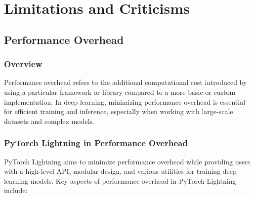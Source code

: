 \documentclass[12pt]{article}
\begin{document}
\section{Limitations and Criticisms}

\subsection{Performance Overhead}

\subsubsection{Overview}

Performance overhead refers to the additional computational cost introduced by using a particular framework or library compared to a more basic or custom implementation. In deep learning, minimizing performance overhead is essential for efficient training and inference, especially when working with large-scale datasets and complex models.

\subsubsection{PyTorch Lightning in Performance Overhead}

PyTorch Lightning aims to minimize performance overhead while providing users with a high-level API, modular design, and various utilities for training deep learning models. Key aspects of performance overhead in PyTorch Lightning include:
\end{document}
